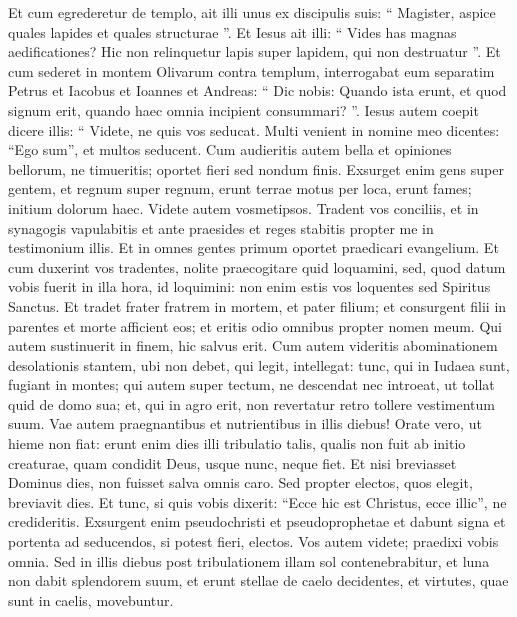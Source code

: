 \begin{biblechapter}
\begin{biblechapter}
\begin{biblechapter}
\begin{biblechapter}
\begin{biblechapter}
\begin{biblechapter}
\begin{biblechapter}
\begin{biblechapter}
\begin{biblechapter}
\begin{biblechapter}
\begin{biblechapter}
\begin{biblechapter}
\begin{biblechapter}
\verse Et cum egrederetur de templo, ait illi unus ex discipulis suis: “ Magister, aspice quales lapides et quales structurae ”. 
\verse Et Iesus ait illi: “ Vides has magnas aedificationes? Hic non relinquetur lapis super lapidem, qui non destruatur ”. 
\verse Et cum sederet in montem Olivarum contra templum, interrogabat eum separatim Petrus et Iacobus et Ioannes et Andreas: 
\verse “ Dic nobis: Quando ista erunt, et quod signum erit, quando haec omnia incipient consummari? ”.
 \verse Iesus autem coepit dicere illis: “ Videte, ne quis vos seducat. 
\verse Multi venient in nomine meo dicentes: “Ego sum”, et multos seducent. 
\verse Cum audieritis autem bella et opiniones bellorum, ne timueritis; oportet fieri sed nondum finis. 
\verse Exsurget enim gens super gentem, et regnum super regnum, erunt terrae motus per loca, erunt fames; initium dolorum haec.
 \verse Videte autem vosmetipsos. Tradent vos conciliis, et in synagogis vapulabitis et ante praesides et reges stabitis propter me in testimonium illis. 
\verse Et in omnes gentes primum oportet praedicari evangelium. 
\verse Et cum duxerint vos tradentes, nolite praecogitare quid loquamini, sed, quod datum vobis fuerit in illa hora, id loquimini: non enim estis vos loquentes sed Spiritus Sanctus. 
 \verse Et tradet frater fratrem in mortem, et pater filium; et consurgent filii in parentes et morte afficient eos; 
\verse et eritis odio omnibus propter nomen meum. Qui autem sustinuerit in finem, hic salvus erit.
 \verse Cum autem videritis abominationem desolationis stantem, ubi non debet, qui legit, intellegat: tunc, qui in Iudaea sunt, fugiant in montes; 
\verse qui autem super tectum, ne descendat nec introeat, ut tollat quid de domo sua; 
\verse et, qui in agro erit, non revertatur retro tollere vestimentum suum. 
\verse Vae autem praegnantibus et nutrientibus in illis diebus! 
\verse Orate vero, ut hieme non fiat: 
\verse erunt enim dies illi tribulatio talis, qualis non fuit ab initio creaturae, quam condidit Deus, usque nunc, neque fiet. 
\verse Et nisi breviasset Dominus dies, non fuisset salva omnis caro. Sed propter electos, quos elegit, breviavit dies. 
\verse Et tunc, si quis vobis dixerit: “Ecce hic est Christus, ecce illic”, ne credideritis. 
\verse Exsurgent enim pseudochristi et pseudoprophetae et dabunt signa et portenta ad seducendos, si potest fieri, electos. 
\verse Vos autem videte; praedixi vobis omnia.
 \verse Sed in illis diebus post tribulationem illam sol contenebrabitur, et luna non dabit splendorem suum, 
\verse et erunt stellae de caelo decidentes, et virtutes, quae sunt in caelis, movebuntur.

\end{biblechapter}
\end{biblechapter}
\end{biblechapter}
\end{biblechapter}
\end{biblechapter}
\end{biblechapter}
\end{biblechapter}
\end{biblechapter}
\end{biblechapter}
\end{biblechapter}
\end{biblechapter}
\end{biblechapter}
\end{biblechapter}
